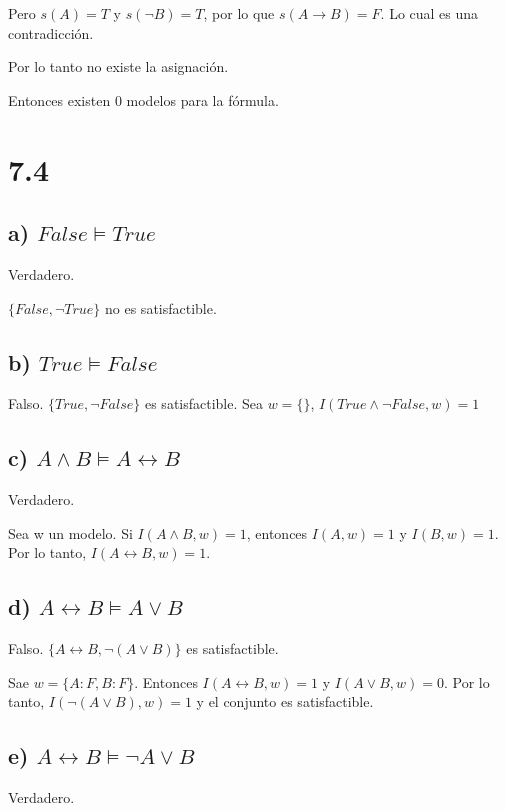\documentclass[spanish]{article}
\begin{document}
Pero $s(A) = T$ y $s(\neg B) = T$, por lo que $s(A\rightarrow B) = F$. Lo cual es una contradicción.

Por lo tanto no existe la asignación.

Entonces existen 0 modelos para la fórmula.

\section*{7.4}

\subsection*{ a) $False \models True$}

Verdadero.

$\{False, \neg True\}$ no es satisfactible.

\subsection*{ b) $True \models False$}

Falso. $\{ True, \neg False\}$ es satisfactible. Sea $w=\{\}$, $I(True\wedge \neg False, w)=1$

\subsection*{c) $A\wedge B \models A \leftrightarrow B$}

Verdadero.

Sea w un modelo. Si $I(A\wedge B,w)=1$, entonces $I(A,w) = 1$ y $I(B,w)=1$. Por lo tanto, $I(A\leftrightarrow B,w) = 1$.

\subsection*{ d) $A\leftrightarrow B \models A \vee B$}

Falso. $\{A\leftrightarrow B, \neg (A\vee B)\}$ es satisfactible.

Sae $w = \{A:F, B:F\}$. Entonces $I(A\leftrightarrow B,w)= 1$ y $I(A\vee B,w)=0$. Por lo tanto, $I(\neg (A\vee B),w)=1$ y el conjunto es satisfactible.

\subsection*{ e) $A\leftrightarrow B \models \neg A \vee B$}

Verdadero.
\end{document}
